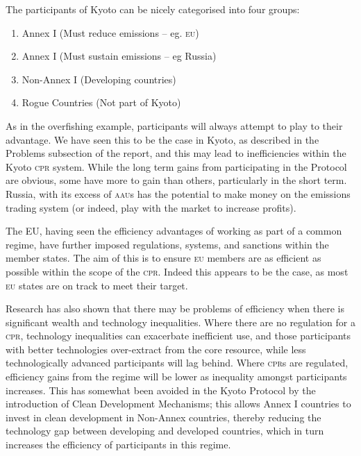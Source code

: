 The participants of Kyoto can be nicely categorised into four groups:
\begin{enumerate}
	\item Annex I (Must reduce emissions – eg. \textsc{eu})
	\item Annex I (Must sustain emissions – eg Russia)
	\item Non-Annex I (Developing countries)
	\item Rogue Countries (Not part of Kyoto)
\end{enumerate}

As in the overfishing example, participants will always attempt to play to their advantage. We have seen this to be the case in Kyoto, as described in the Problems subsection of the report, and this may lead to inefficiencies within the Kyoto \textsc{cpr} system. While the long term gains from participating in the Protocol are obvious, some have more to gain than others, particularly in the short term. Russia, with its excess of \textsc{aau}s has the potential to make money on the emissions trading system (or indeed, play with the market to increase profits).

The EU, having seen the efficiency advantages of working as part of a common regime, have further imposed regulations, systems, and sanctions within the member states. The aim of this is to ensure \textsc{eu} members are as efficient as possible within the scope of the \textsc{cpr}. Indeed this appears to be the case, as most \textsc{eu} states are on track to meet their target.~\cite{EEA-Tracking-progress-20}

Research has also shown that there may be problems of efficiency when there is significant wealth and technology inequalities. Where there are no regulation for a \textsc{cpr}, technology inequalities can exacerbate inefficient use, and those participants with better technologies over-extract from the core resource, while less technologically advanced participants will lag behind. Where \textsc{cpr}s are regulated, efficiency gains from  the regime will be lower as inequality amongst participants increases. This has somewhat been avoided in the Kyoto Protocol by the introduction of Clean Development Mechanisms; this allows Annex I countries to invest in clean development in Non-Annex countries, thereby reducing the technology gap between developing and developed countries, which in turn increases the efficiency of participants in this regime.~\cite{Wealth-inequality-regulated}\cite{Wealth-inequality-unregulated}

